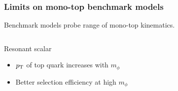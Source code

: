 \documentclass[aspectratio=169,xcolor=dvipsnames,,table,compress]{beamer}
\begin{document}
\begin{frame}[t]   \frametitle{Limits on mono-top benchmark models}
  \vspace{-5mm}
  \centering
    Benchmark models probe range of mono-top kinematics.
    \vspace{3mm}
  \begin{columns}[T]
  \begin{column}{0.5\textwidth}
    \centering
      Resonant scalar
    \begin{itemize}
      \item $p_\text{T}$ of top quark increases with $m_\phi$
      \item Better selection efficiency at high $m_\phi$
    \end{itemize}
    \centering

\end{column}
\end{columns}
\end{frame}
\end{document}
